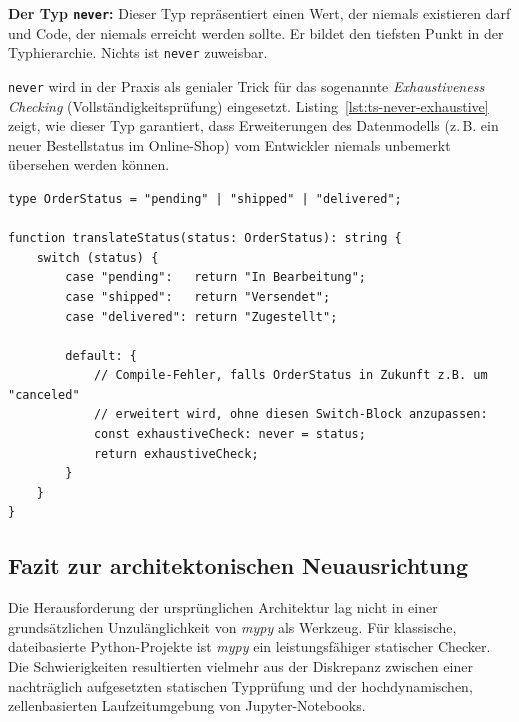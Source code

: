 \begin{definition}
\label{def:ts-never}
\textbf{Der Typ \texttt{never}:} Dieser Typ repräsentiert einen Wert, der niemals existieren darf und Code, der niemals erreicht werden sollte. Er bildet den tiefsten Punkt in der Typhierarchie. Nichts ist \texttt{never} zuweisbar.
\end{definition}

\texttt{never} wird in der Praxis als genialer Trick für das sogenannte \textit{Exhaustiveness Checking} (Vollständigkeitsprüfung) eingesetzt. Listing~\ref{lst:ts-never-exhaustive} zeigt, wie dieser Typ garantiert, dass Erweiterungen des Datenmodells (z.\,B. ein neuer Bestellstatus im Online-Shop) vom Entwickler niemals unbemerkt übersehen werden können.

\begin{listing}[htbp]
    \caption{Vollständige Fallunterscheidung mit \texttt{never}}
    \label{lst:ts-never-exhaustive}
    \begin{verbatim}
type OrderStatus = "pending" | "shipped" | "delivered";

function translateStatus(status: OrderStatus): string {
    switch (status) {
        case "pending":   return "In Bearbeitung";
        case "shipped":   return "Versendet";
        case "delivered": return "Zugestellt";
        
        default: {
            // Compile-Fehler, falls OrderStatus in Zukunft z.B. um "canceled" 
            // erweitert wird, ohne diesen Switch-Block anzupassen:
            const exhaustiveCheck: never = status;
            return exhaustiveCheck;
        }
    }
}
    \end{verbatim}
\end{listing}


\subsection{Fazit zur architektonischen Neuausrichtung}
\label{subsec:warum-typescript-statt-notebook-mypy}

Die Herausforderung der ursprünglichen Architektur lag nicht in einer grundsätzlichen Unzulänglichkeit von \textit{mypy} als Werkzeug. Für klassische, dateibasierte Python-Projekte ist \textit{mypy} ein leistungsfähiger statischer Checker. Die Schwierigkeiten resultierten vielmehr aus der Diskrepanz zwischen einer nachträglich aufgesetzten statischen Typprüfung und der hochdynamischen, zellenbasierten Laufzeitumgebung von Jupyter-Notebooks.

